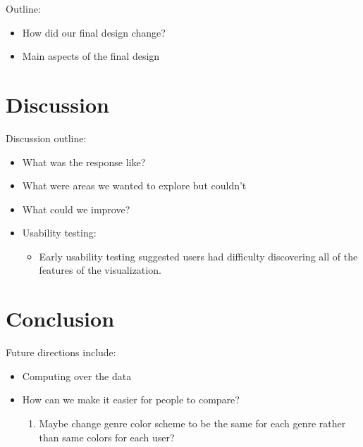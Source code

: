 \documentclass[journal]{vgtc}                %
\begin{document}
Outline:
\begin{itemize}
  \item How did our final design change?
  \item Main aspects of the final design
\end{itemize}

\section{Discussion}

Discussion outline:
\begin{itemize}
  \item What was the response like?
  \item What were areas we wanted to explore but couldn't
  \item What could we improve?
  \item Usability testing:
  \begin{itemize}
    \item Early usability testing suggested users had difficulty discovering all of the features of the visualization.
  \end{itemize}
\end{itemize}

\section{Conclusion}

Future directions include:
\begin{itemize}
  \item Computing over the data
  \item How can we make it easier for people to compare?
  \begin{enumerate}
    \item Maybe change genre color scheme to be the same for each genre rather than same colors for each user?
  \end{enumerate}
\end{itemize}


%

%
%
%


\end{document}
